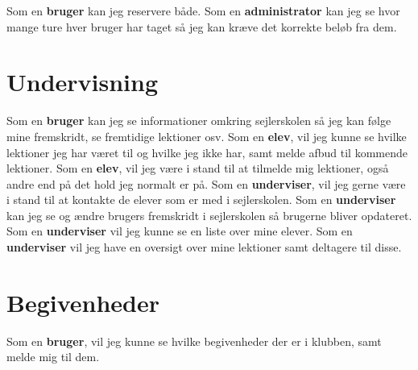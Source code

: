 Som en \textbf{bruger} kan jeg reservere både.
\newline
Som en \textbf{administrator} kan jeg se hvor mange ture hver bruger har taget så jeg kan kræve det korrekte beløb fra dem.

\section{Undervisning}
Som en \textbf{bruger} kan jeg se informationer omkring sejlerskolen så jeg kan følge mine fremskridt, se fremtidige lektioner osv.
\newline
Som en \textbf{elev}, vil jeg kunne se hvilke lektioner jeg har været til og hvilke jeg ikke har, samt melde afbud til kommende lektioner.
\newline
Som en \textbf{elev}, vil jeg være i stand til at tilmelde mig lektioner, også andre end på det hold jeg normalt er på.
\newline
Som en \textbf{underviser}, vil jeg gerne være i stand til at kontakte de elever som er med i sejlerskolen.
\newline
Som en \textbf{underviser} kan jeg se og ændre brugers fremskridt i sejlerskolen så brugerne bliver opdateret.
\newline
Som en \textbf{underviser} vil jeg kunne se en liste over mine elever.
\newline
Som en \textbf{underviser} vil jeg have en oversigt over mine lektioner samt deltagere til disse.

\section{Begivenheder}
Som en \textbf{bruger}, vil jeg kunne se hvilke begivenheder der er i klubben, samt melde mig til dem.